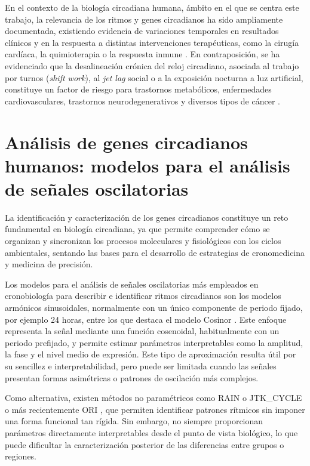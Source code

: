 \documentclass[12pt, a4paper]{report}
\begin{document}
En el contexto de la biología circadiana humana, ámbito en el que se centra este trabajo, la relevancia de los ritmos y genes circadianos ha sido ampliamente documentada, existiendo evidencia de variaciones temporales en resultados clínicos y en la respuesta a distintas intervenciones terapéuticas, como la cirugía cardíaca, la quimioterapia o la respuesta inmune \cite{fudulu2021, marcu2024, ince2023}. En contraposición, se ha evidenciado que la desalineación crónica del reloj circadiano, asociada al trabajo por turnos (\textit{shift work}), al \textit{jet lag} social o a la exposición nocturna a luz artificial, constituye un factor de riesgo para trastornos metabólicos, enfermedades cardiovasculares, trastornos neurodegenerativos y diversos tipos de cáncer \cite{sulli2018, sahar2009}.

\section{Análisis de genes circadianos humanos: modelos para el análisis de señales oscilatorias}

La identificación y caracterización de los genes circadianos constituye un reto fundamental en biología circadiana, ya que permite comprender cómo se organizan y sincronizan los procesos moleculares y fisiológicos con los ciclos ambientales, sentando las bases para el desarrollo de estrategias de cronomedicina y medicina de precisión.

Los modelos para el análisis de señales oscilatorias más empleados en cronobiología para describir e identificar ritmos circadianos son los modelos armónicos sinusoidales, normalmente con un único componente de periodo fijado, por ejemplo 24 horas, entre los que destaca el modelo Cosinor \cite{cosinor}. Este enfoque representa la señal mediante una función cosenoidal, habitualmente con un periodo prefijado, y permite estimar parámetros interpretables como la amplitud, la fase y el nivel medio de expresión. Este tipo de aproximación resulta útil por su sencillez e interpretabilidad, pero puede ser limitada cuando las señales presentan formas asimétricas o patrones de oscilación más complejos.

Como alternativa, existen métodos no paramétricos como RAIN \cite{rain2014} o JTK\_CYCLE \cite{jtkcycle2010} o más recientemente ORI \cite{larriba2020}, que permiten identificar patrones rítmicos sin imponer una forma funcional tan rígida. Sin embargo, no siempre proporcionan parámetros directamente interpretables desde el punto de vista biológico, lo que puede dificultar la caracterización posterior de las diferencias entre grupos o regiones.
\end{document}
